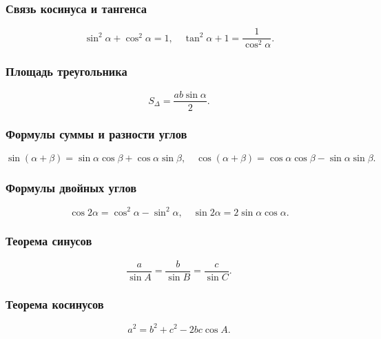 \documentclass[12pt, a4paper]{article}
\begin{document}
\subsubsection*{Связь косинуса и тангенса}
\[
\sin^2\alpha + \cos^2\alpha = 1,
\quad
\tan^2\alpha + 1 = \frac{1}{\cos^2\alpha}.
\]

\subsubsection*{Площадь треугольника}
\[
S_\Delta = \frac{ab\sin\alpha}{2}.
\]

\subsubsection*{Формулы суммы и разности углов}
\[
\sin(\alpha + \beta) = \sin\alpha\cos\beta + \cos\alpha\sin\beta,
\quad
\cos(\alpha + \beta) = \cos\alpha\cos\beta - \sin\alpha\sin\beta.
\]

\subsubsection*{Формулы двойных углов}
\[
\cos2\alpha = \cos^2\alpha - \sin^2\alpha,
\quad
\sin2\alpha = 2\sin\alpha\cos\alpha.
\]

\subsubsection*{Теорема синусов}
\[
\frac{a}{\sin A} = \frac{b}{\sin B} = \frac{c}{\sin C}.
\]

\subsubsection*{Теорема косинусов}
\[
a^2 = b^2 + c^2 - 2bc\cos A.
\]
\end{document}
